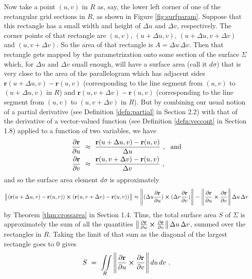 Now take a point $(u,v)$ in $R$ as, say,
the lower left corner of one of the rectangular grid sections in $R$, as shown in Figure \ref{fig:surfparam}. Suppose
that this rectangle has a small width and height of $\Delta u$ and $\Delta v$, respectively. The corner points of that
rectangle are $(u,v)$, $(u+\Delta u,v)$, $(u+\Delta u,v+\Delta v)$ and $(u,v+\Delta v)$.
So the area of that
rectangle is $A = \Delta u\,\Delta v$. Then that rectangle gets mapped by the parametrization onto some section of the
surface $\Sigma$ which, for $\Delta u$ and $\Delta v$ small enough, will have a surface area (call it $d\sigma$) that
is very close to the area of the parallelogram which has adjacent sides $\textbf{r}(u+\Delta u,v) - \textbf{r}(u,v)$
(corresponding to the line segment from $(u,v)$ to $(u+\Delta u,v)$ in $R$) and
$\textbf{r}(u,v+\Delta v) - \textbf{r}(u,v)$ (corresponding to the line segment from $(u,v)$ to $(u,v+\Delta v)$ in
$R$). But by combining our usual notion of a partial derivative (see Definition \ref{defn:partial} in
Section 2.2) with that of the derivative of a vector-valued function (see Definition \ref{defn:veccont} in
Section 1.8) applied to a function of two variables, we have
\begin{align*}
 \frac{\partial \textbf{r}}{\partial u} ~&\approx~ \frac{\textbf{r}(u+\Delta u,v) - \textbf{r}(u,v)}{\Delta u}
 ~,~~\text{and}\vspace{1mm}\\
 \frac{\partial \textbf{r}}{\partial v} ~&\approx~ \frac{\textbf{r}(u,v+\Delta v) - \textbf{r}(u,v)}{\Delta v} ~,
\end{align*}
and so the surface area element $d\sigma$ is approximately
\begin{displaymath}
 \bigl\lVert\mspace{1mu}(\textbf{r}(u+\Delta u,v) - \textbf{r}(u,v)) \bm{\times} (\textbf{r}(u,v+\Delta v) - \textbf{r}(u,v))\mspace{1mu}\bigr\rVert \approx
 \Biggl\lVert\mspace{1mu}(\Delta u \frac{\partial \textbf{r}}{\partial u}) \bm{\times} (\Delta v\frac{\partial \textbf{r}}{\partial v})\mspace{1mu}\Biggr\rVert
 = \Biggl\lVert\mspace{1mu}\frac{\partial \textbf{r}}{\partial u} \bm{\times} \frac{\partial \textbf{r}}{\partial v}\mspace{1mu}\Biggr\rVert\,
 \Delta u \, \Delta v
\end{displaymath}
by Theorem \ref{thm:crossarea} in Section 1.4.
Thus, the total surface area $S$ of $\Sigma$ is approximately the sum of all the quantities
$\bigl\lVert\mspace{1mu}\frac{\partial \textbf{r}}{\partial u} \bm{\times} \frac{\partial \textbf{r}}{\partial v}\mspace{1mu}\bigr\rVert\,\Delta u\,\Delta v$,
summed over the rectangles in $R$. Taking the limit of that sum as the diagonal of the largest rectangle goes to $0$
gives
\begin{equation}
 S ~=~ \iint\limits_{R}\,\Biggl\lVert\mspace{1mu}\frac{\partial \textbf{r}}{\partial u} \bm{\times} \frac{\partial \textbf{r}}{\partial v}\mspace{1mu}\Biggr\rVert
 \,du\,dv ~.
\end{equation}
